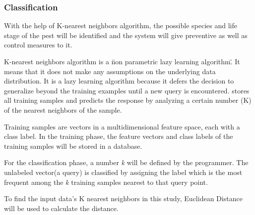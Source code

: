 \documentclass[journal]{./IEEE/IEEEtran}
\begin{document}
	\subsubsection{Classification}
	With the help of K-nearest neighbors algorithm, the possible species and life stage of the pest will be identified and the system will give preventive as well as control measures to it.

	K-nearest neighbors algorithm is a \"non parametric lazy learning algorithm\". It means that it does not make any assumptions on the underlying data distribution. It is a lazy learning algorithm because it defers the decision to generalize beyond the training examples until a new query is encountered. stores all training samples and predicts the response by analyzing a certain number (K) of the nearest neighbors of the sample.\cite{electronic_knn} 

	Training samples are vectors in a multidimensional feature space, each with a class label. In the training phase, the feature vectors and class labels of the training samples will be stored in a database.

	For the classification phase, a number \textit{k} will be defined by the programmer. The unlabeled vector(a query) is classified by assigning the label which is the most frequent among the \textit{k} training samples nearest to that query point.

	To find the input data's K nearest neighbors in this study, Euclidean Distance will be used to calculate the distance.



\end{document}
